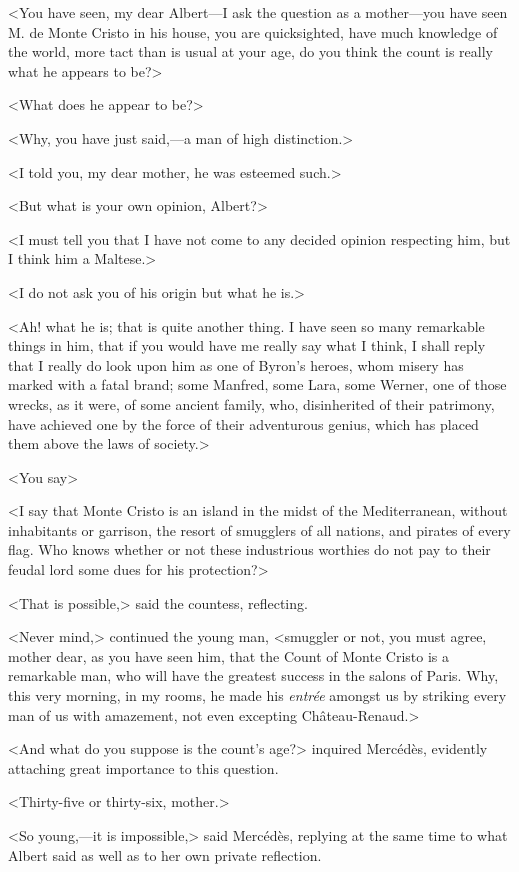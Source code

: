  <You have seen, my dear Albert—I ask the question as a mother—you have seen M. de Monte Cristo in his house, you are quicksighted, have much knowledge of the world, more tact than is usual at your age, do you think the count is really what he appears to be?> 

 <What does he appear to be?> 

 <Why, you have just said,—a man of high distinction.> 

 <I told you, my dear mother, he was esteemed such.> 

 <But what is your own opinion, Albert?> 

 <I must tell you that I have not come to any decided opinion respecting him, but I think him a Maltese.> 

 <I do not ask you of his origin but what he is.> 

 <Ah! what he is; that is quite another thing. I have seen so many remarkable things in him, that if you would have me really say what I think, I shall reply that I really do look upon him as one of Byron's heroes, whom misery has marked with a fatal brand; some Manfred, some Lara, some Werner, one of those wrecks, as it were, of some ancient family, who, disinherited of their patrimony, have achieved one by the force of their adventurous genius, which has placed them above the laws of society.> 

 <You say\longdash> 

 <I say that Monte Cristo is an island in the midst of the Mediterranean, without inhabitants or garrison, the resort of smugglers of all nations, and pirates of every flag. Who knows whether or not these industrious worthies do not pay to their feudal lord some dues for his protection?> 

 <That is possible,> said the countess, reflecting. 

 <Never mind,> continued the young man, <smuggler or not, you must agree, mother dear, as you have seen him, that the Count of Monte Cristo is a remarkable man, who will have the greatest success in the salons of Paris. Why, this very morning, in my rooms, he made his \textit{entrée} amongst us by striking every man of us with amazement, not even excepting Château-Renaud.> 

 <And what do you suppose is the count's age?> inquired Mercédès, evidently attaching great importance to this question. 

 <Thirty-five or thirty-six, mother.> 

 <So young,—it is impossible,> said Mercédès, replying at the same time to what Albert said as well as to her own private reflection. 

